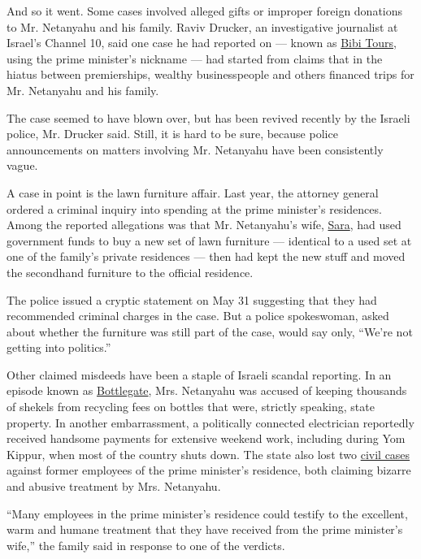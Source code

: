 And so it went. Some cases involved alleged gifts or improper foreign
donations to Mr. Netanyahu and his family. Raviv Drucker, an
investigative journalist at Israel's Channel 10, said one case he had
reported on --- known as
\href{http://www.haaretz.com/israel-news/.premium-1.721152}{Bibi Tours,}
using the prime minister's nickname --- had started from claims that in
the hiatus between premierships, wealthy businesspeople and others
financed trips for Mr. Netanyahu and his family.

The case seemed to have blown over, but has been revived recently by the
Israeli police, Mr. Drucker said. Still, it is hard to be sure, because
police announcements on matters involving Mr. Netanyahu have been
consistently vague.

A case in point is the lawn furniture affair. Last year, the attorney
general ordered a criminal inquiry into spending at the prime minister's
residences. Among the reported allegations was that Mr. Netanyahu's
wife,
\href{http://www.pmo.gov.il/English/PrimeMinister/Pages/PrimeMinistersWife.aspx}{Sara},
had used government funds to buy a new set of lawn furniture ---
identical to a used set at one of the family's private residences ---
then had kept the new stuff and moved the secondhand furniture to the
official residence.

The police issued a cryptic statement on May 31 suggesting that they had
recommended criminal charges in the case. But a police spokeswoman,
asked about whether the furniture was still part of the case, would say
only, ``We're not getting into politics.''

Other claimed misdeeds have been a staple of Israeli scandal reporting.
In an episode known as
\href{http://www.jpost.com/Israel-News/Weinstein-to-rule-on-possible-criminal-probe-against-Netanyahus-in-Bottlegate-affair-389689}{Bottlegate},
Mrs. Netanyahu was accused of keeping thousands of shekels from
recycling fees on bottles that were, strictly speaking, state property.
In another embarrassment, a politically connected electrician reportedly
received handsome payments for extensive weekend work, including during
Yom Kippur, when most of the country shuts down. The state also lost two
\href{http://www.telegraph.co.uk/news/2016/05/31/sara-netanyahu-found-guilty-of-abusive-treatment-of-employee/}{civil
cases} against former employees of the prime minister's residence, both
claiming bizarre and abusive treatment by Mrs. Netanyahu.

``Many employees in the prime minister's residence could testify to the
excellent, warm and humane treatment that they have received from the
prime minister's wife,'' the family said in response to one of the
verdicts.

